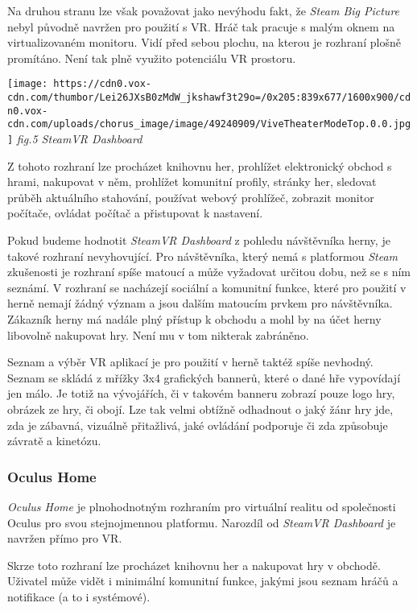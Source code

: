 Na druhou stranu lze však považovat jako nevýhodu fakt, že \emph{Steam
Big Picture} nebyl původně navržen pro použití s VR. Hráč tak pracuje s
malým oknem na virtualizovaném monitoru. Vidí před sebou plochu, na
kterou je rozhraní plošně promítáno. Není tak plně využito potenciálu VR
prostoru.

\texttt{[image: https://cdn0.vox-cdn.com/thumbor/Lei26JXsB0zMdW\_jkshawf3t29o=/0x205:839x677/1600x900/cdn0.vox-cdn.com/uploads/chorus\_image/image/49240909/ViveTheaterModeTop.0.0.jpg]}
\emph{fig.5 SteamVR Dashboard}

Z tohoto rozhraní lze procházet knihovnu her, prohlížet elektronický
obchod s hrami, nakupovat v něm, prohlížet komunitní profily, stránky
her, sledovat průběh aktuálního stahování, používat webový prohlížeč,
zobrazit monitor počítače, ovládat počítač a přistupovat k nastavení.

Pokud budeme hodnotit \emph{SteamVR Dashboard} z pohledu návštěvníka
herny, je takové rozhraní nevyhovující. Pro návštěvníka, který nemá s
platformou \emph{Steam} zkušenosti je rozhraní spíše matoucí a může
vyžadovat určitou dobu, než se s ním seznámí. V rozhraní se nacházejí
sociální a komunitní funkce, které pro použití v herně nemají žádný
význam a jsou dalším matoucím prvkem pro návštěvníka. Zákazník herny má
nadále plný přístup k obchodu a mohl by na účet herny libovolně
nakupovat hry. Není mu v tom nikterak zabráněno.

Seznam a výběr VR aplikací je pro použití v herně taktéž spíše nevhodný.
Seznam se skládá z mřížky 3x4 grafických bannerů, které o dané hře
vypovídají jen málo. Je totiž na vývojářích, či v takovém banneru
zobrazí pouze logo hry, obrázek ze hry, či obojí. Lze tak velmi obtížně
odhadnout o jaký žánr hry jde, zda je zábavná, vizuálně přitažlivá, jaké
ovládání podporuje či zda způsobuje závratě a kinetózu.

\subsubsection{Oculus Home}\label{oculus-home}

\emph{Oculus Home} je plnohodnotným rozhraním pro virtuální realitu od
společnosti Oculus pro svou stejnojmennou platformu. Narozdíl od
\emph{SteamVR Dashboard} je navržen přímo pro VR.

Skrze toto rozhraní lze procházet knihovnu her a nakupovat hry v
obchodě. Uživatel může vidět i minimální komunitní funkce, jakými jsou
seznam hráčů a notifikace (a to i systémové).

